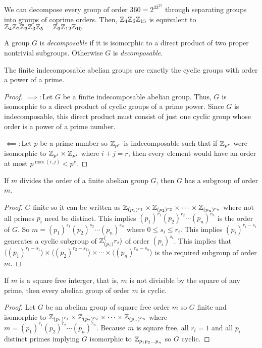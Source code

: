 \begin{example}
    We can decompose every group of order $360 = 2^33^25$ through separating groups into groups of coprime orders. Then, $\mathbb{Z}_{4}\mathbb{Z}_{6}\mathbb{Z}_{15}$ is equivalent to $\mathbb{Z}_{4}\mathbb{Z}_{2}\mathbb{Z}_{3}\mathbb{Z}_{3}\mathbb{Z}_{5} = \mathbb{Z}_3\mathbb{Z}_{12}\mathbb{Z}_{10}.$
\end{example}
\begin{definition}[Decomposable]
    A group $G$ is \emph{decomposable} if it is isomorphic to a direct product of two proper nontrivial subgroups. Otherwise $G$ is \emph{decomposable}.
\end{definition}
\begin{theorem}
    The finite indecomposable abelian groups are exactly the cyclic groups with order a power of a prime.
\end{theorem}
\begin{proof}
    $\implies\colon$Let $G$ be a finite indecomposable abelian group. Thus, $G$ is isomorphic to a direct product of cyclic groups of a prime power. Since $G$ is indecomposable, this direct product must consist of just one cyclic group whose order is a power of a prime number.

    $\impliedby\colon$Let $p$ be a prime number so $\mathbb{Z}_{p^r}$ is indecomposable such that if $\mathbb{Z}_{p^r}$ were isomorphic to $\mathbb{Z}_{p^{i}}\times\mathbb{Z}_{p^{j}}$ where $i+j=r$, then every element would have an order at most $p^{\max(i,j)}<p^r$.
\end{proof}
\begin{theorem}
    If $m$ divides the order of a finite abelian group $G$, then $G$ has a subgroup of order $m$.
\end{theorem}
\begin{proof}
    $G$ finite so it can be written as $\mathbb{Z}_{(p_1)^{r_1}}\times\mathbb{Z}_{(p_2)^{r_2}}\times\cdots\times\mathbb{Z}_{(p_n)^{r_n}}$ where not all primes $p_i$ need be distinct. This implies $(p_1)^{r_1}(p_2)^{r_2}\cdots(p_n)^{r_n}$ is the order of $G$. So $m = (p_1)^{s_1}(p_2)^{s_2}\cdots(p_n)^{s_n}$ where $0 \leq s_i \leq r_i$. This implies $(p_i)^{r_i-s_i}$ generates a cyclic subgroup of $\mathbb{Z}_{(p_i)}^(r_i)$ of order $(p_i)^{s_i}$. This implies that $\langle(p_1)^{r_1-s_1}\rangle\times\langle(p_2)^{r_2-s_2}\rangle\times\cdots\times\langle(p_n)^{r_n-s_n}\rangle$ is the required subgroup of order $m$.
\end{proof}
\begin{theorem}
    If $m$ is a square free interger, that is, $m$ is not divisible by the square of any prime, then every abelian group of order $m$ is cyclic.
\end{theorem}
\begin{proof}
    Let $G$ be an abelian group of square free order $m$ so $G$ finite and isomorphic to $\mathbb{Z}_{(p_1)^{r_1}}\times\mathbb{Z}_{(p_2)^{r_2}}\times\cdots\times\mathbb{Z}_{(p_n)^{r_n}}$ where $m = (p_1)^{r_1}(p_2)^{r_2}\cdots(p_n)^{r_n}.$ Because $m$ is square free, all $r_i =1$ and all $p_i$ distinct primes implying $G$ isomorphic to $\mathbb{Z}_{p_1p_2\ldots p_n}$ so $G$ cyclic.
\end{proof}